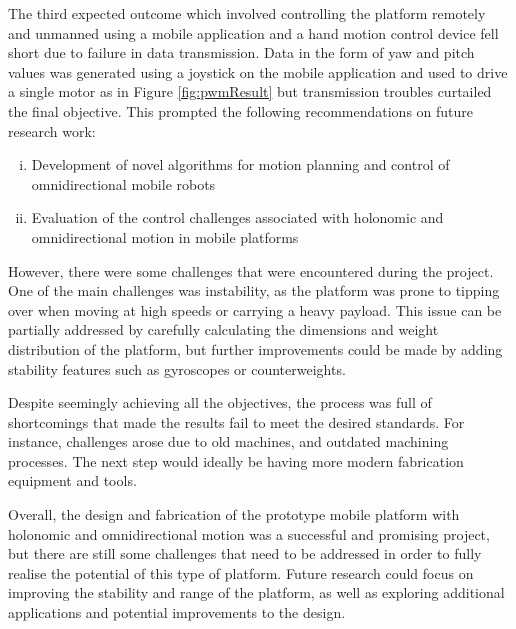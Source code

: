The third expected outcome which involved controlling the platform remotely and unmanned using a mobile application and a hand motion control device fell short due to failure in data transmission. Data in the form of yaw and pitch values was generated using a joystick on the mobile application and used to drive a single motor as in Figure \ref{fig:pwmResult} but transmission troubles curtailed the final objective. This prompted the following recommendations on future research work:
\begin{enumerate}[i.]
    \item Development of novel algorithms for motion planning and control of omnidirectional mobile robots
    \item Evaluation of the control challenges associated with holonomic and omnidirectional motion in mobile platforms
\end{enumerate}

However, there were some challenges that were encountered during the project. One of the main challenges was instability, as the platform was prone to tipping over when moving at high speeds or carrying a heavy payload. This issue can be partially addressed by carefully calculating the dimensions and weight distribution of the platform, but further improvements could be made by adding stability features such as gyroscopes or counterweights.

Despite seemingly achieving all the objectives, the process was full of shortcomings that made the results fail to meet the desired standards. For instance, challenges arose due to old machines, and outdated machining processes. The next step would ideally be having more modern fabrication equipment and tools. 

Overall, the design and fabrication of the prototype mobile platform with holonomic and omnidirectional motion was a successful and promising project, but there are still some challenges that need to be addressed in order to fully realise the potential of this type of platform. Future research could focus on improving the stability and range of the platform, as well as exploring additional applications and potential improvements to the design.
